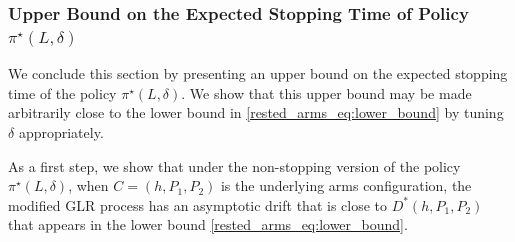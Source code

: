 
\subsubsection{Upper Bound on the Expected Stopping Time of Policy $\pi^\star(L,\delta)$}
We conclude this section by presenting an upper bound on the expected stopping time of the policy $\pi^\star(L,\delta)$. We show that this upper bound may be made arbitrarily close to the lower bound in \eqref{rested_arms_eq:lower_bound} by tuning $\delta$ appropriately.

As a first step, we show that under the non-stopping version of the policy $\pi^\star(L,\delta)$, when $C=(h,P_1,P_2)$ is the underlying arms configuration, the modified GLR process has an asymptotic drift that is close to $D^*(h,P_1,P_2)$ that appears in the lower bound \eqref{rested_arms_eq:lower_bound}.

